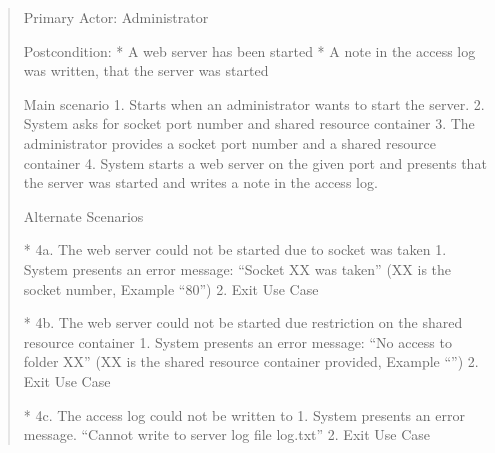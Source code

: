 \begin{quote}
Primary Actor: Administrator

Postcondition: 
* A web server has been started
* A note in the access log was written, that the server was started

Main scenario
1. Starts when an administrator wants to start the server.
2. System asks for socket port number and shared resource container 
3. The administrator provides a socket port number and a shared resource container
4. System starts a web server on the given port and presents that the server was started and writes a note in the access log.

Alternate Scenarios

* 4a. The web server could not be started due to socket was taken
    1. System presents an error message: “Socket XX was taken” (XX is the socket number, Example “80”)
    2. Exit Use Case

* 4b. The web server could not be started due restriction on the shared resource container
    1. System presents an error message: “No access to folder XX” (XX is the shared resource container provided, Example “\var\www”)
    2. Exit Use Case

* 4c. The access log could not be written to
   1. System presents an error message. “Cannot write to server log file log.txt”
   2. Exit Use Case

\end{quote}
